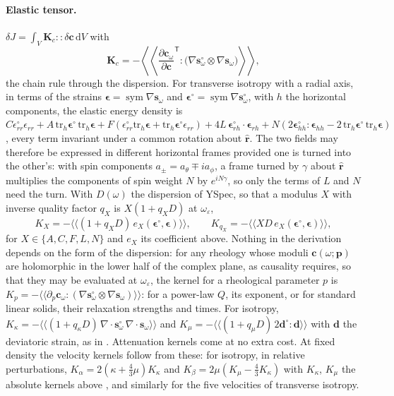 \documentclass[11pt,a4paper]{article}
\newcommand{\bs}{\mathbf{s}}
\newcommand{\bc}{\mathbf{c}}
\newcommand{\br}{\hat{\mathbf{r}}}
\newcommand{\sd}{\mathbf{s}^\circ}
\newcommand{\sym}{\operatorname{sym}}
\newcommand{\dd}{\,\mathrm{d}}
\theoremstyle{remark}
\begin{document}
\paragraph{Elastic tensor.}
$\delta J = \int_V \mathbf{K}_c::\delta\bc\dd V$ with
\begin{equation}
  \mathbf{K}_c = -\left\langle\!\!\left\langle\frac{\partial\bc_\omega}
  {\partial\bc}^{\!\mathsf T}\!\!:\big(\nabla\sd_\omega\otimes\nabla
  \bs_\omega\big)\right\rangle\!\!\right\rangle,
\end{equation}
the chain rule through the dispersion. For transverse isotropy with a radial
axis, in terms of the strains $\bm\epsilon=\sym\nabla\bs_\omega$ and
$\bm\epsilon^\circ=\sym\nabla\sd_\omega$, with $h$ the horizontal
components, the elastic energy density is
$C\epsilon^\circ_{rr}\epsilon_{rr} + A\,\mathrm{tr}_h\bm\epsilon^\circ\,
\mathrm{tr}_h\bm\epsilon + F(\epsilon^\circ_{rr}\mathrm{tr}_h\bm\epsilon +
\mathrm{tr}_h\bm\epsilon^\circ\epsilon_{rr}) + 4L\,\bm\epsilon^\circ_{rh}
\cdot\bm\epsilon_{rh} + N(2\bm\epsilon^\circ_{hh}:\bm\epsilon_{hh} -
2\,\mathrm{tr}_h\bm\epsilon^\circ\,\mathrm{tr}_h\bm\epsilon)$, every term
invariant under a common rotation about $\br$. The two fields may therefore
be expressed in different horizontal frames provided one is turned into the
other's: with spin components $a_\pm = a_\theta\mp ia_\phi$, a frame turned
by $\gamma$ about $\br$ multiplies the components of spin weight $N$ by
$e^{iN\gamma}$, so only the terms of $L$ and $N$ need the turn. With
$D(\omega)$ the dispersion of YSpec, so
that a modulus $X$ with inverse quality factor $q_X$ is $X(1+q_XD)$ at
$\omega_\varepsilon$,
\begin{equation}
  K_X = -\langle\!\langle(1+q_XD)\,e_X(\bm\epsilon^\circ,\bm\epsilon)
  \rangle\!\rangle, \qquad
  K_{q_X} = -\langle\!\langle X D\,e_X(\bm\epsilon^\circ,\bm\epsilon)
  \rangle\!\rangle,
\end{equation}
for $X\in\{A,C,F,L,N\}$ and $e_X$ its coefficient above. Nothing in the
derivation depends on the form of the dispersion: for any rheology whose
moduli $\bc(\omega;\mathbf{p})$ are holomorphic in the lower half of the
complex plane, as causality requires, so that they may be evaluated at
$\omega_\varepsilon$, the kernel for a rheological parameter $p$ is
$K_p = -\langle\!\langle\partial_p\bc_\omega:(\nabla\sd_\omega\otimes
\nabla\bs_\omega)\rangle\!\rangle$: for a power-law $Q$, its exponent, or for
standard linear solids, their relaxation strengths and times. For isotropy,
$K_\kappa = -\langle\!\langle(1+q_\kappa D)\,\nabla\cdot\sd_\omega\,
\nabla\cdot\bs_\omega\rangle\!\rangle$ and $K_\mu = -\langle\!\langle
(1+q_\mu D)\,2\mathbf{d}^\circ:\mathbf{d}\rangle\!\rangle$ with $\mathbf{d}$
the deviatoric strain, as in \citet[][eqs~63--64]{LiuTromp2008}.
Attenuation kernels come at no extra cost. At fixed density the velocity
kernels follow from these: for isotropy, in relative perturbations,
$K_\alpha = 2(\kappa+\tfrac43\mu)K_\kappa$ and $K_\beta = 2\mu(K_\mu -
\tfrac43K_\kappa)$ with $K_\kappa$, $K_\mu$ the absolute kernels above
\citep[cf.][eq.~68]{LiuTromp2008}, and similarly for the five velocities of
transverse isotropy.
\end{document}
